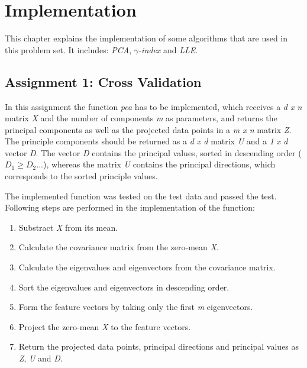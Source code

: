 \chapter{Implementation}
\label{chap:implementation}

This chapter explains the implementation of some algorithms that are used in this problem set. It includes: \textit{PCA}, \textit{$\gamma$-index} and \textit{LLE}.

\section{Assignment 1: Cross Validation}
\label{sec:assignment1}

In this assignment the function \textit{pca} has to be implemented, which receives a \textit{d x n} matrix \textit{X} and the number of components \textit{m} as parameters, and returns the principal components as well as the projected data points in a \textit{m x n} matrix \textit{Z}. The principle components should be returned as a \textit{d x d} matrix \textit{U} and a \textit{1 x d} vector \textit{D}. The vector \textit{D} contains the principal values, sorted in descending order ($D_1 \geq D_2 ...$), whereas the matrix \textit{U} contains the principal directions, which corresponds to the sorted principle values.

The implemented function was tested on the test data and passed the test. Following steps are performed in the implementation of the function:
\begin{enumerate}
	\item Substract \textit{X} from its mean.
	\item Calculate the covariance matrix from the zero-mean \textit{X}.
	\item Calculate the eigenvalues and eigenvectors from the covariance matrix.
	\item Sort the eigenvalues and eigenvectors in descending order.
	\item Form the feature vectors by taking only the first \textit{m} eigenvectors.
	\item Project the zero-mean \textit{X} to the feature vectors.
	\item Return the projected data points, principal directions and principal values as \textit{Z}, \textit{U} and \textit{D}.
\end{enumerate}

